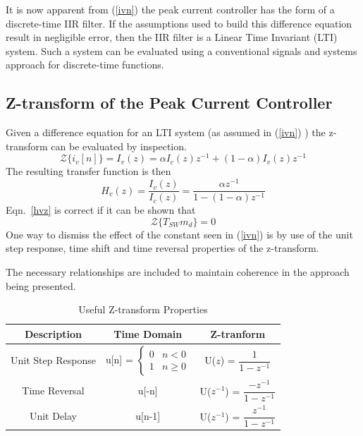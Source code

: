 \documentclass[conference]{IEEEtran}
\begin{document}
It is now apparent from (\ref{ivn}) the peak current controller has the form of a discrete-time IIR filter. If the assumptions used to build this difference equation result in negligible error, then the IIR filter is a Linear Time Invariant (LTI) system. Such a system can be evaluated using a conventional signals and systems approach for discrete-time functions.

\subsection{Z-transform of the Peak Current Controller}
Given a difference equation for an LTI system (as assumed in (\ref{ivn}) ) the z-transform can be evaluated by inspection.  
\begin{equation}
\mathcal{Z} \{ i_v[n] \} = I_v (z) =  \alpha I_c(z) z^{-1} + ( 1 - \alpha ) I_v (z) z^{-1}  \label{ivz}
\end{equation}
The resulting transfer function is then
\begin{equation}
H_v(z) = \frac {I_v(z)} {I_c(z)} = \frac {\alpha z^{-1}} {1 - (1-\alpha) z^{-1}}  \label{hvz}
\end{equation}
Eqn.~\ref{hvz} is correct if it can be shown that
\begin{equation}
 \mathcal{Z} \{ T_{SW} m_d \} = 0 \label{zconst}
\end{equation}
One way to dismiss the effect of the constant seen in (\ref{ivn}) is by use of the unit step response, time shift and time reversal properties of the z-transform.

The necessary relationships are included to maintain coherence in the approach being presented.

\begin{table}[H]
	\caption{Useful Z-transform Properties}
	\begin{center}
		\begin{tabular}{|c|c|c|}
			\hline
			\textbf{Description}& \textbf{Time Domain}& \textbf{Z-tranform}\\
			\hline
			Unit Step Response & 
			u[n] =
			$ \begin{cases} 
				0 & n < 0 \\
				1 & n \geq 0 
			\end{cases} $ 
			 & U($ \mathit{z} $) = $\dfrac{1}{1-z^{-1}}$ \\
			\hline
			
			
			Time Reversal& u[-n]& U($ \mathit{z^{-1}} $) = $\dfrac{-z^{-1}}{1-z^{-1}}$  \\
			\hline
			Unit Delay & u[n-1] & U($ \mathit{z^{-1}} $) = $\dfrac{z^{-1}}{1-z^{-1}}$  \\
			\hline

		\end{tabular}
		\label{tabun}
	\end{center}
\end{table}
\end{document}
